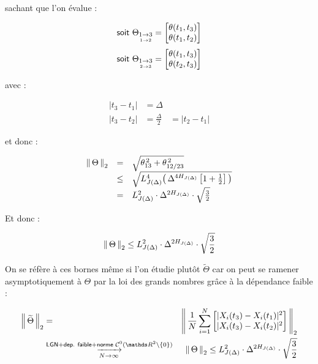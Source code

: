 sachant que l'on évalue :

\begin{equation}
	\textsf{soit }
	\Theta_{\underset{1 \rightarrow 2}{1 \rightarrow 3}} = \begin{bmatrix} \theta(t_1, t_3) \\ \theta(t_1, t_2) \end{bmatrix}
\end{equation}
\begin{equation}
	\textsf{soit }
	\Theta_{\underset{2 \rightarrow 3}{1 \rightarrow 3}} = \begin{bmatrix} \theta(t_1, t_3) \\ \theta(t_2, t_3) \end{bmatrix}
\end{equation}


avec :

\begin{equation}
	\begin{array}{ccc}
		|t_3 - t_1| & = \Delta
		\\
		|t_3 - t_2| & = \frac \Delta 2 & = |t_2 - t_1|
	\end{array}\label{eq:couples_diff_delta_value}
\end{equation}

et donc :

\begin{equation}
	\displaystyle
	\begin{array}{rclr}
		\left\lVert \, \Theta \, \right\rVert _ {2} & =    & \sqrt{\theta_{13}^{\,2} + \theta_{12/23}^{\, 2}}
		\\
		                & \leq & \sqrt{ L_{J(\Delta)}^4 \bigl( \, \Delta^{4 H_{J(\Delta)}} \left[ 1 + \frac 1 2 \right]  \, \bigr) }
		\\
		                & =    & L_{J(\Delta)}^2 \cdot \Delta^{2H_{J(\Delta)}} \cdot \sqrt{\frac 3 2}
	\end{array}
\end{equation}

Et donc :

\begin{equation*}
	\left\lVert \, \Theta \, \right\rVert _ {2} \leq L_{J(\Delta)}^2 \cdot \Delta^{2H_{J(\Delta)}} \cdot \sqrt{\frac 3 2}
\end{equation*}

On se réfère à ces bornes même si l'on étudie plutôt $\widetilde \Theta$ car on peut se ramener asymptotiquement à $\Theta$ par la loi des grands nombres grâce à la dépendance faible :

\begin{align}
	 &  & \norme 2 {\widetilde \Theta} & =                                                                                                                      & \norme 2 {\frac 1 N \sum_{i=1}^{N} \begin{bmatrix} | X_i(t_3) - X_i(t_1) |^2 \\ | X_i(t_3) - X_i(t_2) |^2 \end{bmatrix}} &  &
	\\
	 &  &                              & \overset {\textsf{LGN} + \textsf{dep. faible} + \textsf{norme } \mathcal C^0(\R 2 \backslash\{ 0\}) }{\tend N \infty } & \norme 2 \Theta \leq L_{J(\Delta)}^2 \cdot \Delta^{2H_{J(\Delta)}} \cdot \sqrt{\frac 3 2}                                &  &
\end{align}

